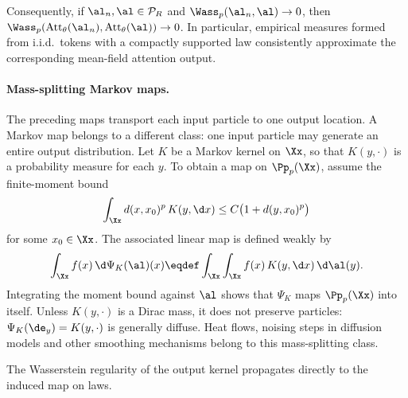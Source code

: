 Consequently, if \(\al_n,\al\in\mathcal P_R\) and \(\Wass_p(\al_n,\al)\to0\), then \(\Wass_p(\operatorname{Att}_\theta(\al_n),\operatorname{Att}_\theta(\al))\to0\). In particular, empirical measures formed from i.i.d.\ tokens with a compactly supported law consistently approximate the corresponding mean-field attention output.

\paragraph{Mass-splitting Markov maps.}

The preceding maps transport each input particle to one output location. A Markov map belongs to a different class: one input particle may generate an entire output distribution. Let $K$ be a Markov kernel on $\Xx$, so that $K(y,\cdot)$ is a probability measure for each $y$. To obtain a map on $\Pp_p(\Xx)$, assume the finite-moment bound
\[
	\int_{\Xx} d(x,x_0)^p\,K(y,\d x)
	\leq C\bigl(1+d(y,x_0)^p\bigr)
\]
for some $x_0\in\Xx$. The associated linear map is defined weakly by
\begin{equation}\label{eq-measure-map-markov-kernel}
	\int_{\Xx} f(x)\,\d\Psi_K(\al)(x)
	\eqdef
	\int_{\Xx}\int_{\Xx} f(x)\,K(y,\d x)\,\d\al(y).
\end{equation}
Integrating the moment bound against $\al$ shows that $\Psi_K$ maps $\Pp_p(\Xx)$ into itself. Unless $K(y,\cdot)$ is a Dirac mass, it does not preserve particles: $\Psi_K(\de_y)=K(y,\cdot)$ is generally diffuse. Heat flows, noising steps in diffusion models and other smoothing mechanisms belong to this mass-splitting class.

The Wasserstein regularity of the output kernel propagates directly to the induced map on laws.

